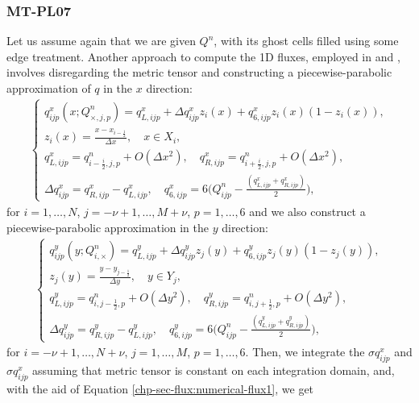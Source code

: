 \subsubsection{MT-PL07}
\label{mt-pl07}
Let us assume again that we are given $Q^n$, with its ghost cells filled using some edge treatment.
Another approach to compute the 1D fluxes, employed in \citet{putman:2007} and \citet{lin:2004},
involves disregarding the metric tensor and constructing a piecewise-parabolic approximation of $q$ in the $x$ direction:
\begin{align}
	\label{chp5-ppmx-eq1-pl07}
	\begin{cases}
		q_{ijp}^x(x;Q_{\times, j,p}^n) = q_{L,ijp}^x + \Delta q_{ijp}^x z_i(x) + q_{6,ijp}^xz_i(x)(1-z_i(x)), \\
		z_i(x) = \frac{x-x_{i-\frac{1}{2}}}{\Delta x},
		\quad x \in X_i,\\
		q_{L,ijp}^x = q_{i-\frac{i}{2},j,p}^n+ O(\Delta x^2),\quad
		q_{R,ijp}^x = q_{i+\frac{i}{2},j,p}^n+ O(\Delta x^2),\\
		\Delta q_{ijp}^x = q_{R,ijp}^x - q_{L,ijp}^x,\quad
		q_{6,ijp}^x = 6\bigg(Q_{ijp}^n - \frac{(q_{L,ijp}^x + q_{R,ijp}^x)}{2}\bigg),
	\end{cases}
\end{align}
for $i=1, \ldots, N$, $j=-\nu+1, \ldots, M+\nu$, $p=1,\ldots,6$ and we also construct a piecewise-parabolic
approximation in the $y$ direction:
\begin{align}
	\label{chp5-ppmy-pl07}
	\begin{cases}
		q_{ijp}^y(y;Q_{i,\times}^n) = q_{L,ijp}^y + \Delta q_{ijp}^y z_j(y) + q_{6,ijp}^yz_j(y)(1-z_j(y)),\\ 
		z_j(y) = \frac{y-y_{j-\frac{1}{2}}}{\Delta y},
		\quad y \in Y_j,\\
		q_{L,ijp}^y = q_{i,j-\frac{1}{2},p}^n+ O(\Delta y^2),\quad
		q_{R,ijp}^y = q_{i,j+\frac{1}{2},p}^n+ O(\Delta y^2),\\
		\Delta q_{ijp}^y = q_{R,ijp}^y - q_{L,ijp}^y,\quad
		q_{6,ijp}^y = 6\bigg(Q_{ijp}^n - \frac{(q_{L,ijp}^y + q_{R,ijp}^y)}{2}\bigg),
	\end{cases}
\end{align}
for $i=-\nu+1, \ldots, N+\nu$, $j=1, \ldots, M$, $p=1,\ldots,6$. Then, we integrate the $\sigma q_{ijp}^x$ and
$\sigma q_{ijp}^x$ assuming that metric tensor is constant on each integration domain, and, with the aid of 
Equation \eqref{chp-sec-flux:numerical-flux1}, we get
